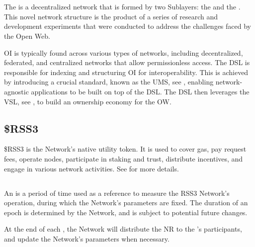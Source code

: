 \section{}

The  is a decentralized network that is formed by two Sublayers: the  and the .
This novel network structure is the product of a series of research and development experiments that were conducted to address the challenges faced by the Open Web.

\gls{OI} is typically found across various types of networks, including decentralized, federated, and centralized networks that allow permissionless access.
The \gls{DSL} is responsible for indexing and structuring \gls{OI} for interoperability.
This is achieved by introducing a crucial standard, known as the \gls{UMS}, see , enabling network-agnostic applications to be built on top of the \gls{DSL}.
The \gls{DSL} then leverages the \gls{VSL}, see , to build an ownership economy for the \gls{OW}.

\subsection{\$RSS3}
\$RSS3 is the Network's native utility token. It is used to cover gas, pay request fees, operate nodes, participate in staking and trust, distribute incentives, and engage in various network activities. See  for more details.

\subsection{}

An  is a period of time used as a reference to measure the RSS3 Network’s operation, during which the Network's parameters are fixed.
The duration of an epoch is determined by the Network, and is subject to potential future changes.

At the end of each \epoch, the Network will distribute the \gls{NR} to the 's participants, and update the Network's parameters when necessary.